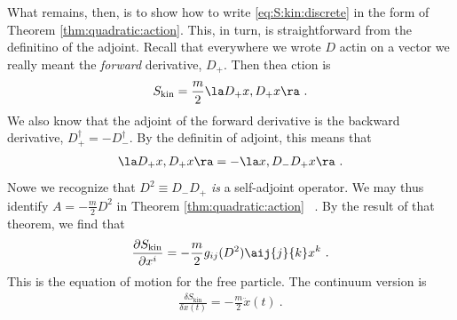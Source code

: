 What remains, then, is to show how to write \eqref{eq:S:kin:discrete} in the form of Theorem \ref{thm:quadratic:action}. This, in turn, is straightforward from the definitino of the adjoint. Recall that everywhere we wrote $D$ actin on a vector we really meant the \emph{forward} derivative, $D_+$. Then thea ction is
\begin{align}
    S_\text{kin} = \frac{m}{2} \la D_+x , D_+x \ra  \ .
\end{align}
We also know that the adjoint of the forward derivative is the backward derivative, $D_+^\dag =- D_-^\dag$. By the definitin of adjoint, this means that 
\begin{align}
    \la D_+x , D_+x \ra = 
    - \la x , D_- D_+x \ra \ .
\end{align}
Nowe we recognize that $D^2 \equiv D_- D_+$ \emph{is} a self-adjoint operator. We may thus identify $A =- \frac{m}{2}D^2$ in Theorem \ref{thm:quadratic:action} \ . By the result of that theorem, we find that
\begin{align}
    \frac{\partial S_\text{kin}}{\partial x^i}
    = 
    - \frac{m}{2} g_{ij} (D^2)\aij{j}{k}x^k \ .
\end{align}
This is the equation of motion for the free particle. The continuum version is
\begin{align}
    \frac{\delta S_\text{kin}}{\delta x(t)}
    = - \frac{m}{2}\ddot x(t) \ .
\end{align}
